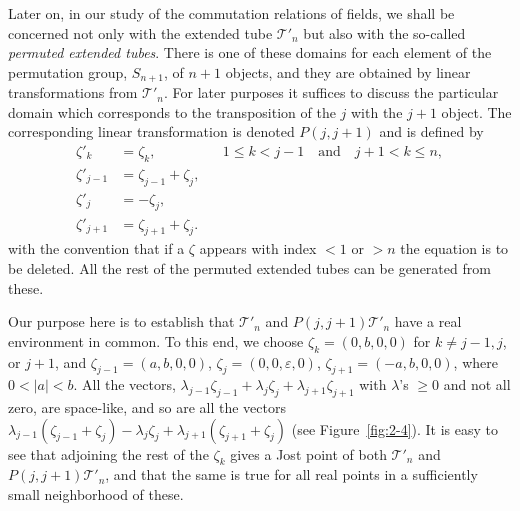 Later on, in our study of the commutation relations of fields, we shall be
concerned not only with the extended tube $\mathcal{T}'_{n}$ but also with the
so-called \emph{permuted extended tubes}.  There is one of these domains for
each element of the permutation group, $S_{n+1}$, of $n+1$ objects,
and they are obtained by linear transformations from $\mathcal{T}'_{n}$.  For later
purposes it suffices to discuss the particular domain which corresponds to the
transposition of the $j$ with the $j+1$ object.  The corresponding linear
transformation is denoted $P(j,j+1)$ and is defined by
\begin{equation}
\begin{aligned}
  \zeta'_k&=\zeta_k, &&1\leq k<j-1\quad\text{and}\quad j+1<k\leq n,\\
  \zeta'_{j-1}&=\zeta_{j-1}+\zeta_j,\\
  \zeta'_j&=-\zeta_j,\\
  \zeta'_{j+1}&=\zeta_{j+1}+\zeta_j .
\end{aligned}
\tag{2-93}\label{eq:ch2-permutation}
\end{equation}
with the convention that if a $\zeta$ appears with index $<1$ or $>n$ the
equation is to be deleted.  All the rest of the permuted extended tubes can be
generated from these.

Our purpose here is to establish that $\mathcal{T}'_{n}$ and
$P(j,j+1)\mathcal{T}'_{n}$ have a real environment in common.  To this end,
we choose $\zeta_k=(0,b,0,0)$ for $k\neq j-1,j$, or $j+1$, and
$\zeta_{j-1}=(a,b,0,0)$, $\zeta_j=(0,0,\varepsilon,0)$,
$\zeta_{j+1}=(-a,b,0,0)$, where $0<|a|<b$.  All the vectors,
$\lambda_{j-1}\zeta_{j-1}+\lambda_j\zeta_j+\lambda_{j+1}\zeta_{j+1}$ with
$\lambda$'s $\geq0$ and not all zero, are space-like, and so are all the
vectors
$\lambda_{j-1}(\zeta_{j-1}+\zeta_j)-\lambda_j\zeta_j+
\lambda_{j+1}(\zeta_{j+1}+\zeta_j)$ (see Figure~\ref{fig:2-4}).  It is easy to see
that adjoining the rest of the $\zeta_k$ gives a Jost point of both
$\mathcal{T}'_{n}$ and $P(j,j+1)\mathcal{T}'_{n}$, and that the same is true
for all real points in a sufficiently small neighborhood of these.


